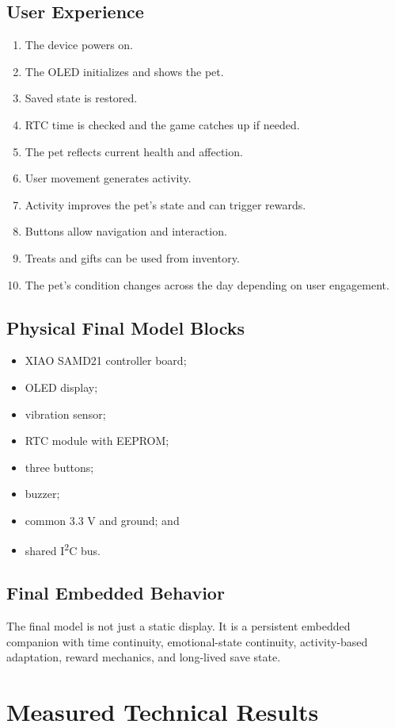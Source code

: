 \documentclass[conference]{IEEEtran}
\begin{document}
\subsection{User Experience}
\begin{enumerate}
\item The device powers on.
\item The OLED initializes and shows the pet.
\item Saved state is restored.
\item RTC time is checked and the game catches up if needed.
\item The pet reflects current health and affection.
\item User movement generates activity.
\item Activity improves the pet's state and can trigger rewards.
\item Buttons allow navigation and interaction.
\item Treats and gifts can be used from inventory.
\item The pet's condition changes across the day depending on user engagement.
\end{enumerate}

\subsection{Physical Final Model Blocks}
\begin{itemize}
\item XIAO SAMD21 controller board;
\item OLED display;
\item vibration sensor;
\item RTC module with EEPROM;
\item three buttons;
\item buzzer;
\item common 3.3 V and ground; and
\item shared I\textsuperscript{2}C bus.
\end{itemize}

\subsection{Final Embedded Behavior}
The final model is not just a static display. It is a persistent embedded companion with time continuity, emotional-state continuity, activity-based adaptation, reward mechanics, and long-lived save state.

\section{Measured Technical Results}
\end{document}
